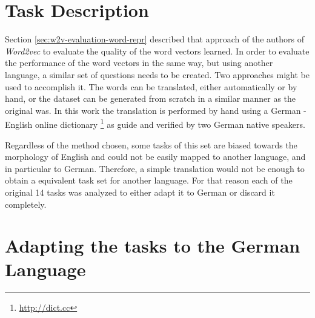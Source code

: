 \section{Task Description}
\label{sec:task_description} 


Section \ref{sec:w2v-evaluation-word-repr} described that approach of the
authors of \textit{Word2vec} to evaluate the quality of the word vectors
learned. In order to evaluate the performance of the word vectors in the same
way, but using another language,  a
similar set of questions  needs to be created. Two approaches might be used
to accomplish it. The words can be translated, either automatically or by hand, or the dataset can be
generated from scratch in a similar manner as the original was.  In this work
the translation is performed by hand using a German - English online
dictionary \footnote{\url{http://dict.cc}} as guide and verified by two German native speakers.

Regardless of the method chosen, some tasks of this set are biased towards
the morphology of English and could not be easily mapped to another language,
and in particular to German. Therefore, a simple translation would not be
enough to obtain a equivalent task set for another language. For that reason
each of the original 14 tasks was analyzed to either adapt it to German or
discard it completely.  


\section{Adapting the tasks to the German Language}
\label{sec:adapt_task_german_lang}

